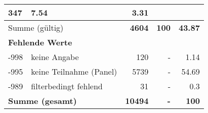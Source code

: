 \begin{longtable}{lXrrr}
       \num{347} &
       \num[round-mode=places,round-precision=2]{7.54} &
         \num[round-mode=places,round-precision=2]{3.31} \\
     \midrule
     \multicolumn{2}{l}{Summe (gültig)} &
       \textbf{\num{4604}} &
     \textbf{\num{100}} &
       \textbf{\num[round-mode=places,round-precision=2]{43.87}} \\
     \multicolumn{5}{l}{\textbf{Fehlende Werte}}\\
       -998 &
       keine Angabe &
         \num{120} &
        - &
         \num[round-mode=places,round-precision=2]{1.14} \\
       -995 &
       keine Teilnahme (Panel) &
         \num{5739} &
        - &
         \num[round-mode=places,round-precision=2]{54.69} \\
       -989 &
       filterbedingt fehlend &
         \num{31} &
        - &
         \num[round-mode=places,round-precision=2]{0.3} \\
     \midrule
     \multicolumn{2}{l}{\textbf{Summe (gesamt)}} &
          \textbf{\num{10494}} &
        \textbf{-} &
        \textbf{\num{100}} \\
     \bottomrule
     \end{longtable}
     
